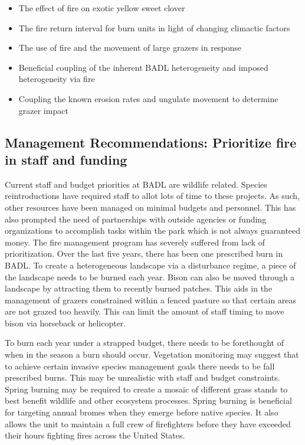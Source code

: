 \begin{itemize}
\item
  The effect of fire on exotic yellow sweet clover
\item
  The fire return interval for burn units in light of changing climactic
  factors
\item
  The use of fire and the movement of large grazers in response
\item
  Beneficial coupling of the inherent BADL heterogeneity and imposed
  heterogeneity via fire
\item
  Coupling the known erosion rates and ungulate movement to determine
  grazer impact
\end{itemize}

\subsection{Management Recommendations: Prioritize fire in staff and funding}

Current staff and budget priorities at BADL are wildlife related.
Species reintroductions have required staff to allot lots of time to these projects. 
As such, other resources have been managed on minimal budgets and personnel.
This has also prompted the need of partnerships with outside agencies or funding organizations to accomplish tasks within the park which is not always guaranteed money. 
The fire management program has severely suffered from lack of prioritization.
Over the last five years, there has been one prescribed burn in BADL. 
To create a heterogeneous landscape via a disturbance regime, a piece of the landscape needs to be burned each year. 
Bison can also be moved through a landscape by attracting them to recently burned patches. 
This aids in the management of grazers constrained within a fenced pasture so that certain areas are not grazed too heavily. 
This can limit the amount of staff timing to move bison via horseback or helicopter.

To burn each year under a strapped budget, there needs to be forethought of when in the season a burn should occur. 
Vegetation monitoring may suggest that to achieve certain invasive species management goals there needs to be fall prescribed burns. 
This may be unrealistic with staff and budget constraints. 
Spring burning may be required to create a mosaic of different grass stands to best benefit wildlife and other ecosystem processes. 
Spring burning is beneficial for targeting annual bromes when they emerge before native species. 
It also allows the unit to maintain a full crew of firefighters before they have exceeded their hours fighting fires across the United States.
